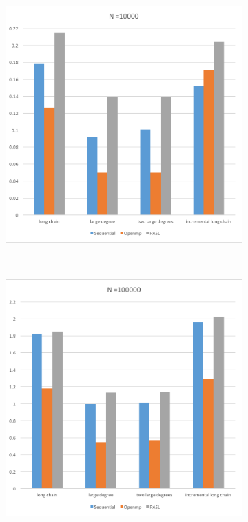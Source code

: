 \documentclass[specification,annotation,times]{itmo-student-thesis}
\begin{document}
\begin{figure}[!ht]
\centering
\begin{subfigure}[b]{0.45\textwidth}
    \includegraphics[width=\textwidth]{pic/results-2-a.png}
\end{subfigure}~~\begin{subfigure}[b]{0.45\textwidth}
    \includegraphics[width=\textwidth]{pic/results-2-b.png}

\end{subfigure}
\end{figure}
\end{document}
